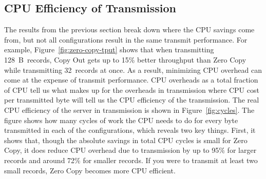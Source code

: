 

\subsection {CPU Efficiency of Transmission}
The results from the previous section break down where the CPU savings come from,
but not all configurations result in the same transmit performance. For
example, Figure~\ref{fig:zero-copy-tput} shows that when transmitting
128~B~records, Copy Out gets up to 15\% better throughput than Zero Copy while transmitting
32~records at once. As a result, minimizing CPU overhead can come at the expense of transmit
performance. CPU overheads as a total fraction of CPU tell us what makes up for the overheads 
in transmission where CPU cost per transmitted byte will tell us the CPU efficiency of the 
transmission. The real CPU efficiency of the server in transmission is shown in
Figure~\ref{fig:cycles}. The figure shows how many cycles of work the CPU needs to do
for every byte transmitted in each of the configurations, which reveals two key things.
First, it shows that, though the absolute savings in total CPU cycles is small
for Zero Copy, it does reduce CPU overhead due to transmission by up to 95\% for 
larger records and around 72\% for smaller records. If you were to transmit at least 
two small records, Zero Copy becomes more CPU efficient.
\newline


%

%

